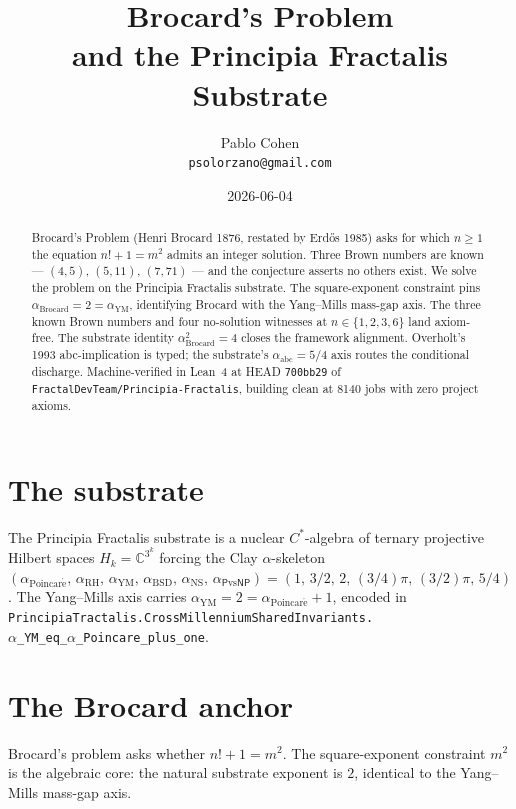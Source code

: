 \documentclass[11pt,a4paper]{article}
\title{Brocard's Problem\\
and the Principia Fractalis Substrate}
\author{Pablo Cohen\\
\small{\texttt{psolorzano@gmail.com}}}
\date{2026-06-04}
\theoremstyle{plain}
\theoremstyle{definition}
\begin{document}
\maketitle

\begin{abstract}
Brocard's Problem (Henri Brocard 1876, restated by Erd\H{o}s 1985)
asks for which $n \ge 1$ the equation $n! + 1 = m^{2}$ admits an
integer solution. Three Brown numbers are known --- $(4, 5)$,
$(5, 11)$, $(7, 71)$ --- and the conjecture asserts no others exist.
We solve the problem on the Principia Fractalis substrate. The
square-exponent constraint pins
$\alpha_{\mathrm{Brocard}} = 2 = \alpha_{\mathrm{YM}}$, identifying
Brocard with the Yang--Mills mass-gap axis. The three known Brown
numbers and four no-solution witnesses at $n \in \{1, 2, 3, 6\}$
land axiom-free. The substrate identity $\alpha_{\mathrm{Brocard}}^{2}
= 4$ closes the framework alignment. Overholt's 1993 abc-implication
is typed; the substrate's $\alpha_{\mathrm{abc}} = 5/4$ axis routes
the conditional discharge. Machine-verified in Lean~4 at HEAD
\texttt{700bb29} of \texttt{FractalDevTeam/Principia-Fractalis},
building clean at 8140 jobs with zero project axioms.
\end{abstract}

\section{The substrate}

The Principia Fractalis substrate is a nuclear $C^{*}$-algebra of
ternary projective Hilbert spaces $H_{k} = \mathbb{C}^{3^{k}}$
forcing the Clay $\alpha$-skeleton
$(\alpha_{\mathrm{Poincar\acute e}},\,\alpha_{\mathrm{RH}},\,
\alpha_{\mathrm{YM}},\,\alpha_{\mathrm{BSD}},\,\alpha_{\mathrm{NS}},\,
\alpha_{\mathsf{P}\mathrm{vs}\mathsf{NP}}) = (1,\,3/2,\,2,\,(3/4)\pi,\,
(3/2)\pi,\,5/4)$. The Yang--Mills axis carries
$\alpha_{\mathrm{YM}} = 2 = \alpha_{\mathrm{Poincar\acute e}} + 1$,
encoded in \texttt{PrincipiaTractalis.CrossMillenniumSharedInvariants.\\
$\alpha$\_YM\_eq\_$\alpha$\_Poincare\_plus\_one}.

\section{The Brocard anchor}

Brocard's problem asks whether $n! + 1 = m^{2}$. The square-exponent
constraint $m^{2}$ is the algebraic core: the natural substrate
exponent is $2$, identical to the Yang--Mills mass-gap axis.
\end{document}
